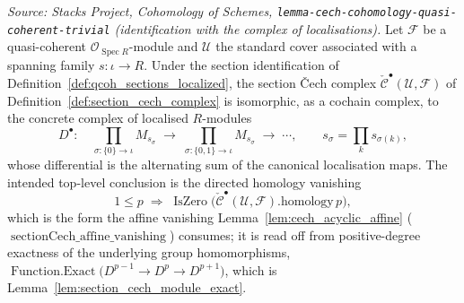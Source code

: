 \begin{lemma}
  \textit{Source: Stacks Project, Cohomology of Schemes,
  \texttt{lemma-cech-cohomology-quasi-coherent-trivial} (identification with the
  complex of localisations).}
  Let \(\mathcal{F}\) be a quasi-coherent \(\mathcal{O}_{\operatorname{Spec}
  R}\)-module and \(\mathcal{U}\) the standard cover associated with a spanning family
  \(s : \iota \to R\). Under the section identification of
  Definition~\ref{def:qcoh_sections_localized}, the section {\v C}ech complex
  \(\check{\mathcal{C}}^\bullet(\mathcal{U}, \mathcal{F})\) of
  Definition~\ref{def:section_cech_complex} is isomorphic, as a cochain complex, to
  the concrete complex of localised \(R\)-modules
  \[
    D^\bullet : \quad
    \prod_{\sigma : \{0\} \to \iota} M_{s_\sigma} \;\longrightarrow\;
    \prod_{\sigma : \{0,1\} \to \iota} M_{s_\sigma} \;\longrightarrow\;
    \cdots,
    \qquad
    s_\sigma = \prod_{k} s_{\sigma(k)},
  \]
  whose differential is the alternating sum of the canonical localisation maps. The
  intended top-level conclusion is the directed homology vanishing
  \[
    1 \leq p
    \;\Longrightarrow\;
    \operatorname{IsZero}\bigl(\check{\mathcal{C}}^\bullet(\mathcal{U},
      \mathcal{F}).\mathrm{homology}\, p\bigr),
  \]
  which is the form the affine vanishing
  Lemma~\ref{lem:cech_acyclic_affine} (\(\operatorname{sectionCech\_affine\_vanishing}\))
  consumes; it is read off from positive-degree exactness of the underlying group
  homomorphisms,
  \(\operatorname{Function.Exact}\bigl(D^{p-1} \to D^p \to D^{p+1}\bigr)\), which is
  Lemma~\ref{lem:section_cech_module_exact}.


\end{lemma}
